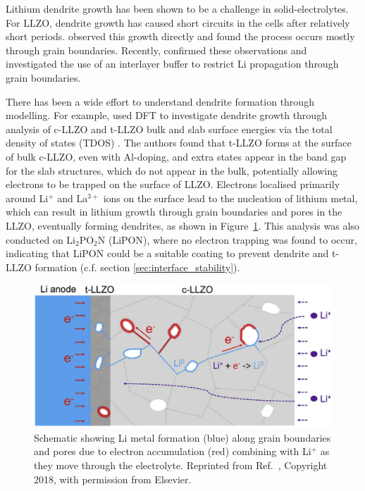 \documentclass[../main.tex]{subfiles}
\begin{document}
Lithium dendrite growth has been shown to be a challenge in solid-electrolytes. For LLZO, dendrite growth has caused short circuits in the cells after relatively short periods\cite{Ren2015,Sudo2014}. \citeauthor{Cheng2017} observed this growth directly and found the process occurs mostly through grain boundaries.\cite{Cheng2017} Recently, \citeauthor{Kim2020} confirmed these observations and investigated the use of an interlayer buffer to restrict Li propagation through grain boundaries.\cite{Kim2020}

There has been a wide effort to understand dendrite formation through modelling\cite{Canepa2018, Tian2018, Gao2020}. For example, \citeauthor{Tian2018} used DFT to investigate dendrite growth through analysis of c-LLZO and t-LLZO bulk and slab surface energies via the total density of states (TDOS) \cite{Tian2018}. The authors found that t-LLZO forms at the surface of bulk c-LLZO, even with Al-doping\cite{Ma2016, Rettenwander2018}, and extra states appear in the band gap for the slab structures, which do not appear in the bulk, potentially allowing electrons to be trapped on the surface of LLZO. Electrons localised primarily around Li$^+$ and La$^{3+}$ ions on the surface lead to the nucleation of lithium metal, which can result in lithium growth through grain boundaries and pores in the LLZO, eventually forming dendrites\cite{Ren2015}, as shown in Figure~\ref{fig:tian2020}. This analysis was also conducted on Li$_2$PO$_2$N (LiPON), where no electron trapping was found to occur, indicating that LiPON could be a suitable coating to prevent dendrite and t-LLZO formation (c.f. section \ref{sec:interface_stability}).

\begin{figure}[H]
    \centering
    \includegraphics{figures/tian_grain_growth.png}
    \caption{Schematic showing Li metal formation (blue) along grain boundaries and pores due to electron accumulation (red) combining with Li$^+$ as they move through the electrolyte. Reprinted from Ref.~, Copyright 2018, with permission from Elsevier.}
    \label{fig:tian2020}
\end{figure}
\end{document}
